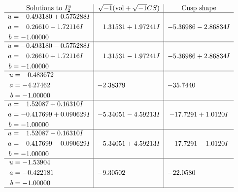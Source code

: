 \documentclass[1p]{elsarticle_modified}
\theoremstyle{definition}
\newcommand{\I}{\sqrt{-1}}
\begin{document}
$$\begin{array}{c|c|c}  
\text{Solutions to }I^u_{2}& \I (\text{vol} + \sqrt{-1}CS) & \text{Cusp shape}\\
 \hline 
\begin{aligned}
u &= -0.493180 + 0.575288 I \\
a &= \phantom{-}0.26610 - 1.72116 I \\
b &= -1.00000\phantom{ +0.000000I}\end{aligned}
 & \phantom{-}1.31531 + 1.97241 I & -5.36986 - 2.86834 I \\ \hline\begin{aligned}
u &= -0.493180 - 0.575288 I \\
a &= \phantom{-}0.26610 + 1.72116 I \\
b &= -1.00000\phantom{ +0.000000I}\end{aligned}
 & \phantom{-}1.31531 - 1.97241 I & -5.36986 + 2.86834 I \\ \hline\begin{aligned}
u &= \phantom{-}0.483672\phantom{ +0.000000I} \\
a &= -4.27462\phantom{ +0.000000I} \\
b &= -1.00000\phantom{ +0.000000I}\end{aligned}
 & -2.38379\phantom{ +0.000000I} & -35.7440\phantom{ +0.000000I} \\ \hline\begin{aligned}
u &= \phantom{-}1.52087 + 0.16310 I \\
a &= -0.417699 + 0.090629 I \\
b &= -1.00000\phantom{ +0.000000I}\end{aligned}
 & -5.34051 - 4.59213 I & -17.7291 + 1.0120 I \\ \hline\begin{aligned}
u &= \phantom{-}1.52087 - 0.16310 I \\
a &= -0.417699 - 0.090629 I \\
b &= -1.00000\phantom{ +0.000000I}\end{aligned}
 & -5.34051 + 4.59213 I & -17.7291 - 1.0120 I \\ \hline\begin{aligned}
u &= -1.53904\phantom{ +0.000000I} \\
a &= -0.422181\phantom{ +0.000000I} \\
b &= -1.00000\phantom{ +0.000000I}\end{aligned}
 & -9.30502\phantom{ +0.000000I} & -22.0580\phantom{ +0.000000I}\\
 \hline 
 \end{array}$$\newpage
\end{document}
